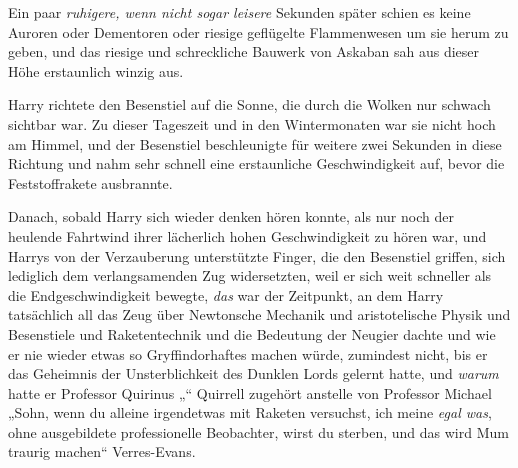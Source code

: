 Ein paar \emph{ruhigere, wenn nicht sogar leisere} Sekunden später schien es keine Auroren oder Dementoren oder riesige geflügelte Flammenwesen um sie herum zu geben, und das riesige und schreckliche Bauwerk von Askaban sah aus dieser Höhe erstaunlich winzig aus.

Harry richtete den Besenstiel auf die Sonne, die durch die Wolken nur schwach sichtbar war. Zu dieser Tageszeit und in den Wintermonaten war sie nicht hoch am Himmel, und der Besenstiel beschleunigte für weitere zwei Sekunden in diese Richtung und nahm sehr schnell eine erstaunliche Geschwindigkeit auf, bevor die Feststoffrakete ausbrannte.

Danach, sobald Harry sich wieder denken hören konnte, als nur noch der heulende Fahrtwind ihrer lächerlich hohen Geschwindigkeit zu hören war, und Harrys von der Verzauberung unterstützte Finger, die den Besenstiel griffen, sich lediglich dem verlangsamenden Zug widersetzten, weil er sich weit schneller als die Endgeschwindigkeit bewegte, \emph{das} war der Zeitpunkt, an dem Harry tatsächlich all das Zeug über Newtonsche Mechanik und aristotelische Physik und Besenstiele und Raketentechnik und die Bedeutung der Neugier dachte und wie er nie wieder etwas so Gryffindorhaftes machen würde, zumindest nicht, bis er das Geheimnis der Unsterblichkeit des Dunklen Lords gelernt hatte, und \emph{warum} hatte er Professor Quirinus „“ Quirrell zugehört anstelle von Professor Michael „Sohn, wenn du alleine irgendetwas mit Raketen versuchst, ich meine \emph{egal was}, ohne ausgebildete professionelle Beobachter, wirst du sterben, und das wird Mum traurig machen“ Verres-Evans.

